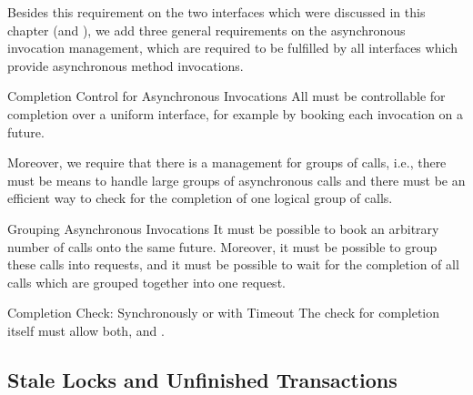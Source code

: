 \documentclass[a4paper, 12pt]{book}
\begin{document}
Besides this requirement on the two interfaces which were discussed in
this chapter (\TRANSACTION and \DBAI), we add three general
requirements on the asynchronous invocation management, which are
required to be fulfilled by all interfaces which provide asynchronous
method invocations.
%
\begin{requirement*}{Completion Control for Asynchronous Invocations}
  All  must be controllable for completion over a
  uniform interface, for example by booking each invocation on a future.
\end{requirement*}
%
Moreover, we require that there is a management for groups of calls, i.e., 
there must be means to handle large groups of asynchronous calls and there
must be an efficient way to check for the completion of one logical group of
calls. 
%
\begin{requirement*}{Grouping Asynchronous Invocations}
  It must be possible to book an arbitrary number of calls onto the same
  future. Moreover, it must be possible to group these calls into requests,
  and it must be possible to wait for the completion of all calls which are
  grouped together into one request.
\end{requirement*}
%
\begin{requirement*}{Completion Check: Synchronously or with Timeout}
  The check for completion itself must allow both, 
  and .
\end{requirement*}


\subsection{Stale Locks and Unfinished Transactions}
\end{document}
